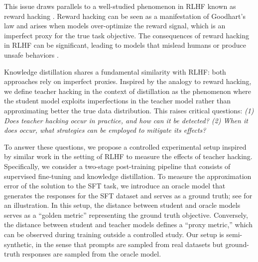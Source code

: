This issue draws parallels to a well-studied phenomenon in RLHF known as reward hacking \cite{amodei2016concrete,pan2022effects,gao2023scaling}. Reward hacking can be seen as a manifestation of Goodhart's law and arises when models over-optimize the reward signal, which is an imperfect proxy for the true task objective. The consequences of reward hacking in RLHF can be significant, leading to models that mislead humans or produce unsafe behaviors \cite{hendrycks2021unsolved,wen2024language}. 

Knowledge distillation shares a fundamental similarity with RLHF: both approaches rely on imperfect proxies. Inspired by the analogy to reward hacking, we define teacher hacking in the context of distillation as the phenomenon where the student model exploits imperfections in the teacher model rather than approximating better the true data distribution. This raises critical questions: \textit{(1) Does teacher hacking occur in practice, and how can it be detected? (2) When it does occur, what strategies can be employed to mitigate its effects?} 


To answer these questions, we propose a controlled experimental setup inspired by similar work in the setting of RLHF \cite{gao2023scaling} to measure the effects of teacher hacking. Specifically, we consider a two-stage post-training pipeline that consists of supervised fine-tuning and knowledge distillation. To measure the approximation error of the solution to the SFT task, we introduce an oracle model that generates the responses for the SFT dataset and serves as a ground truth; see  for an illustration. In this setup, the distance between student and oracle models serves as a ``golden metric'' representing the ground truth objective. Conversely, the distance between student and teacher models defines a ``proxy metric,'' which can be observed during training outside a controlled study. 
Our setup is semi-synthetic, in the sense that prompts are sampled from real datasets but ground-truth responses are sampled from the oracle model.


